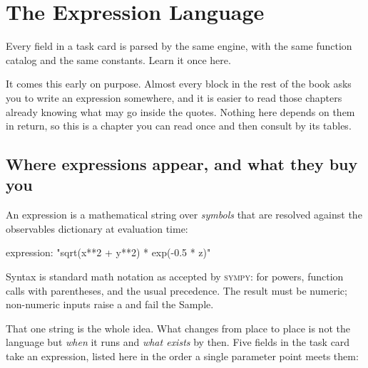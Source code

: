 \chapter{The Expression Language}
\label{ch:expressions}

 Every  field in a task card is
parsed by the same engine, with the same function catalog and the same constants. Learn it
once here.

It comes this early on purpose. Almost every block in the rest of the book asks you to
write an expression somewhere, and it is easier to read those chapters already knowing
what may go inside the quotes. Nothing here depends on them in return, so this is a
chapter you can read once and then consult by its tables.

\section{Where expressions appear, and what they buy you}
\label{sec:expr-model}
\label{sec:expr-where}

An expression is a mathematical string over \emph{symbols} that are resolved against the
observables dictionary at evaluation time:

\begin{yamlwin}
expression: "sqrt(x**2 + y**2) * exp(-0.5 * z)"
\end{yamlwin}

Syntax is standard math notation as accepted by
\textsc{sympy}: \code{**} for powers, function calls with parentheses,
and the usual precedence. The result must be numeric; non-numeric inputs raise a
 and fail the Sample.

That one string is the whole idea. What changes from place to place is not the language
but \emph{when} it runs and \emph{what exists} by then. Five fields in the task card take
an expression, listed here in the order a single parameter point meets them:

